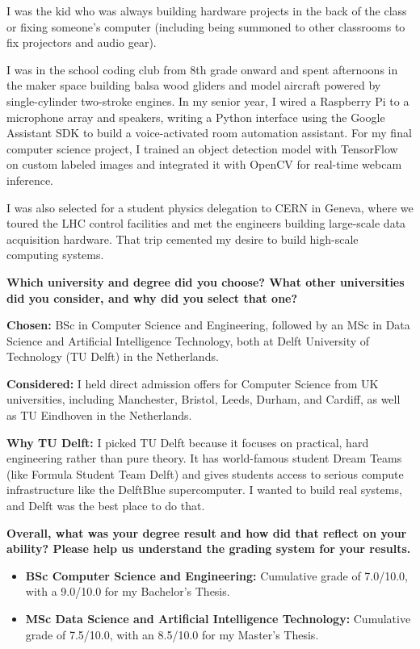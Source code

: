 \documentclass[letterpaper,11pt]{article}
\newcommand{\interviewQuestion}[1]{%
  \vspace{8pt}%
  \textbf{\color{airforceblue}#1}\par%
}
\begin{document}
I was the kid who was always building hardware projects in the back of the class or fixing someone's computer (including being summoned to other classrooms to fix projectors and audio gear).

I was in the school coding club from 8th grade onward and spent afternoons in the maker space building balsa wood gliders and model aircraft powered by single-cylinder two-stroke engines. In my senior year, I wired a Raspberry Pi to a microphone array and speakers, writing a Python interface using the Google Assistant SDK to build a voice-activated room automation assistant. For my final computer science project, I trained an object detection model with TensorFlow on custom labeled images and integrated it with OpenCV for real-time webcam inference.

I was also selected for a student physics delegation to CERN in Geneva, where we toured the LHC control facilities and met the engineers building large-scale data acquisition hardware. That trip cemented my desire to build high-scale computing systems.

\interviewQuestion{Which university and degree did you choose? What other universities did you consider, and why did you select that one?}

\textbf{Chosen:} BSc in Computer Science and Engineering, followed by an MSc in Data Science and Artificial Intelligence Technology, both at Delft University of Technology (TU Delft) in the Netherlands.

\textbf{Considered:} I held direct admission offers for Computer Science from UK universities, including Manchester, Bristol, Leeds, Durham, and Cardiff, as well as TU Eindhoven in the Netherlands.

\textbf{Why TU Delft:} I picked TU Delft because it focuses on practical, hard engineering rather than pure theory. It has world-famous student Dream Teams (like Formula Student Team Delft) and gives students access to serious compute infrastructure like the DelftBlue supercomputer. I wanted to build real systems, and Delft was the best place to do that.

\interviewQuestion{Overall, what was your degree result and how did that reflect on your ability? Please help us understand the grading system for your results.}

\begin{itemize}[leftmargin=0.2in, itemsep=3pt]
    \item \textbf{BSc Computer Science and Engineering:} Cumulative grade of 7.0/10.0, with a 9.0/10.0 for my Bachelor's Thesis.
    \item \textbf{MSc Data Science and Artificial Intelligence Technology:} Cumulative grade of 7.5/10.0, with an 8.5/10.0 for my Master's Thesis.
\end{itemize}
\end{document}
